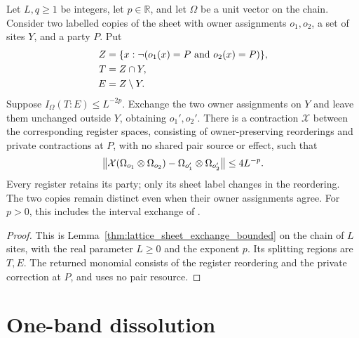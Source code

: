 \begin{lemma}
    \label{thm:chain_plain_exchange}
    \leanok
    Let $L,q\ge1$ be integers, let $p\in\mathbb R$, and let $\Omega$ be a
    unit vector on the chain. Consider two labelled copies of the sheet with
    owner assignments $o_1,o_2$, a set of sites $Y$, and a party $P$. Put
    \begin{align}
        Z & =\{x:\neg(o_1(x)=P\ \text{and}\ o_2(x)=P)\},\notag \\
        T & =Z\cap Y,\notag                                    \\
        E & =Z\setminus Y.\notag
    \end{align}
    Suppose $I_\Omega(T:E)\le L^{-2p}$. Exchange the two owner assignments
    on $Y$ and leave them unchanged outside $Y$, obtaining $o_1',o_2'$.
    There is a contraction $\mathcal X$ between the corresponding
    register spaces, consisting of owner-preserving reorderings and
    private contractions at $P$, with no shared pair source or effect, such
    that
    \begin{align}
        \bigl\|\mathcal X(\Omega_{o_1}\otimes\Omega_{o_2})
        -\Omega_{o_1'}\otimes\Omega_{o_2'}\bigr\|
        \le4L^{-p}.\notag
    \end{align}
    Every register retains its party; only its sheet label changes in the
    reordering. The two copies remain distinct even when their owner
    assignments agree. For $p>0$, this includes the interval exchange of
    \cite[Part~II]{TNLean2026OneDimensional}.
    
\end{lemma}
\begin{proof}
    \leanok
    This is Lemma~\ref{thm:lattice_sheet_exchange_bounded} on the chain of
    $L$ sites, with the real parameter $L\ge0$ and the exponent $p$. Its
    splitting regions are $T,E$. The returned monomial consists of the register
    reordering and the private correction at $P$, and uses no pair resource.
\end{proof}

\section{One-band dissolution}

